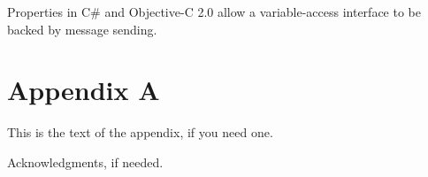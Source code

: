 \documentclass[preprint,authoryear,10pt]{sigplanconf}
\begin{document}
Properties in C\# and Objective-C 2.0 allow a variable-access interface to be backed by 
message sending.


\appendix
\section{Appendix A}

This is the text of the appendix, if you need one.

\acks

Acknowledgments, if needed.





\end{document}
